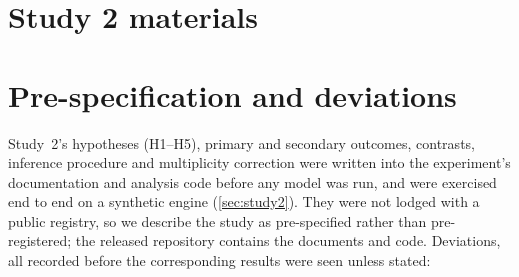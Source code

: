 \clearpage
\section{Study 2 materials}
\label{app:materials}


\clearpage

\section{Pre-specification and deviations}
\label{app:prereg}

Study~2's hypotheses (H1--H5), primary and secondary outcomes, contrasts, inference procedure and multiplicity
correction were written into the experiment's documentation and analysis code before any model was run, and were
exercised end to end on a synthetic engine (\cref{sec:study2}). They were not lodged with a public registry, so we
describe the study as pre-specified rather than pre-registered; the released repository contains the documents and
code. Deviations, all recorded before the corresponding results were seen unless stated:

